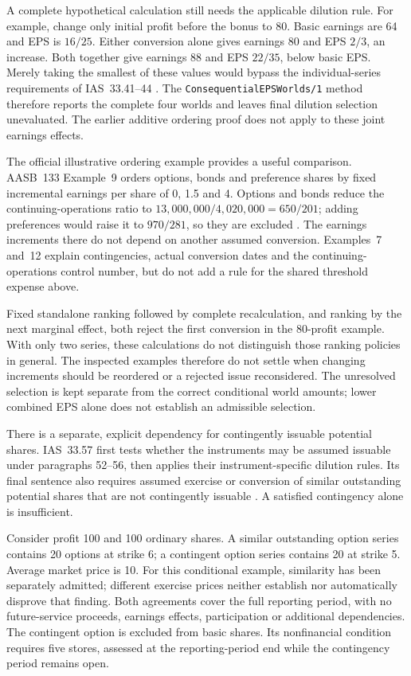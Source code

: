 A complete hypothetical calculation still needs the applicable dilution rule.
For example, change only initial profit before the bonus to 80. Basic earnings
are 64 and EPS is \(16/25\). Either conversion alone gives earnings 80 and
EPS \(2/3\), an increase. Both together give earnings 88 and EPS \(22/35\),
below basic EPS. Merely taking the smallest of these values would bypass the
individual-series requirements of IAS~33.41--44
\citep[IAS~33.41--44]{eu20231803}. The
\texttt{ConsequentialEPSWorlds/1} method therefore reports the complete four
worlds and leaves final dilution selection unevaluated. The earlier additive
ordering proof does not apply to these joint earnings effects.


The official illustrative ordering example provides a useful comparison.
AASB~133 Example~9 orders options, bonds and preference shares by fixed
incremental earnings per share of 0, 1.5 and 4. Options and bonds reduce the
continuing-operations ratio to \(13{,}000{,}000/4{,}020{,}000=650/201\);
adding preferences would raise it to \(970/281\), so they are excluded
\citep[Example~9, pp.~28--30]{aasb133scope2021}. The earnings increments there
do not depend on another assumed conversion. Examples~7 and~12 explain
contingencies, actual conversion dates and the continuing-operations control
number, but do not add a rule for the shared threshold expense above.

Fixed standalone ranking followed by complete recalculation, and ranking by
the next marginal effect, both reject the first conversion in the 80-profit
example. With only two series, these calculations do not distinguish those
ranking policies in general. The inspected examples therefore do not settle
when changing increments should be reordered or a rejected issue reconsidered.
The unresolved selection is kept separate from the correct conditional world
amounts; lower combined EPS alone does not establish an admissible selection.

There is a separate, explicit dependency for contingently issuable potential
shares. IAS~33.57 first tests whether the instruments may be assumed issuable
under paragraphs 52--56, then applies their instrument-specific dilution rules.
Its final sentence also requires assumed exercise or conversion of similar
outstanding potential shares that are not contingently issuable
\citep[IAS~33.52--57]{eu20231803}. A satisfied contingency alone is insufficient.

Consider profit 100 and 100 ordinary shares. A similar outstanding option
series contains 20 options at strike 6; a contingent option series contains
20 at strike 5. Average market price is 10. For this conditional example,
similarity has been separately admitted; different exercise prices neither
establish nor automatically disprove that finding. Both agreements cover the
full reporting period, with no future-service proceeds, earnings effects,
participation or additional dependencies. The contingent option is excluded
from basic shares. Its nonfinancial condition requires five stores, assessed
at the reporting-period end while the contingency period remains open.

